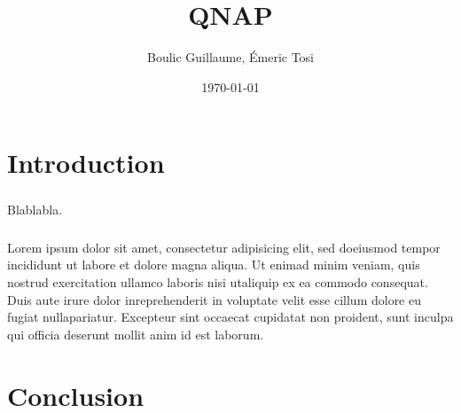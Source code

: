 \documentclass[a4paper,11pt]{report}
\title{QNAP}
\author{Boulic Guillaume, Émeric Tosi}
\date{\today}
\begin{document}
    \maketitle{} %



    \setcounter{tocdepth}{1} %
    \renewcommand{\contentsname}{Sommaire} %
    \tableofcontents{} %
    \clearpage



\chapter*{Introduction}
        \paragraph{}
Blablabla.
        \paragraph{}
Lorem ipsum dolor sit amet, consectetur adipisicing elit, sed doeiusmod tempor incididunt ut labore et dolore magna aliqua.
Ut enimad minim veniam, quis nostrud exercitation ullamco laboris nisi utaliquip ex ea commodo consequat.
Duis aute irure dolor inreprehenderit in voluptate velit esse cillum dolore eu fugiat nullapariatur.
Excepteur sint occaecat cupidatat non proident, sunt inculpa qui officia deserunt mollit anim id est laborum.
    \clearpage


%

\clearpage


%

\clearpage


%
\chapter*{Conclusion}
\end{document}
